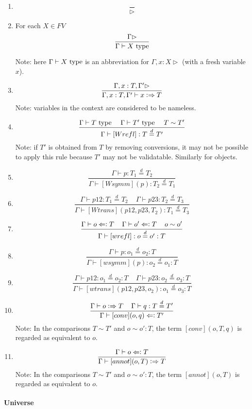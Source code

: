 \documentclass[11pt]{article}
\newcommand{\eqd}{\stackrel{d}{=}}
\newcommand{\spc}{{\,\,\,\,\,\,\,}}
\newcommand{\synth}{\vcentcolon\Rightarrow}
\newcommand{\force}{\Leftarrow\vcentcolon}
\newcommand{\Type}{\mathop{{\, \rm type}}}
\begin{document}
\begin{enumerate}
\item 
$$\frac{}{\rhd}$$
\item For each $X\in FV$
$$\frac{\Gamma\rhd}{\Gamma\vdash X \Type}$$

Note: here $\Gamma\vdash X \Type$ is an abbreviation for $\Gamma, x:X\rhd$
(with a fresh variable $x$).

\item 
$$\frac{\Gamma, x:T, \Gamma'\rhd}{\Gamma, x:T, \Gamma'\vdash x \synth T}$$
Note: variables in the context are considered to be nameless.

\item 
$$\frac{\Gamma \vdash T \Type\spc \Gamma \vdash T'\Type \spc T\sim T'}{\Gamma\vdash [Wrefl]: T\eqd T'}$$
Note: if $T'$ is obtained from $T$ by removing conversions, it may not be possible to apply
this rule because $T'$ may not be validatable.  Similarly for objects.
\item 
$$\frac{\Gamma\vdash p:T_1\eqd T_2}{\Gamma\vdash [Wsymm](p):T_2\eqd T_1}$$
\item 
$$\frac{\Gamma\vdash p12:T_1\eqd T_2\spc\Gamma\vdash p23:T_2\eqd T_3}{\Gamma\vdash [Wtrans](p12,p23,T_2): T_1\eqd T_3}$$
\item 
$$\frac{\Gamma\vdash o \force T\spc\Gamma\vdash o' \force T \spc o \sim o'}{\Gamma\vdash [wrefl]:o\eqd o':T}$$
\item 
$$\frac{\Gamma\vdash p:o_1\eqd o_2:T}{\Gamma\vdash [wsymm](p):o_2\eqd o_1:T}$$
\item 
$$\frac{\Gamma\vdash p12:o_1\eqd o_2:T\spc\Gamma\vdash p23:o_2\eqd o_3:T}{\Gamma\vdash [wtrans](p12,p23,o_2):o_1\eqd o_3:T}$$
\item 
$$\frac{\Gamma\vdash o \synth T\spc \Gamma\vdash q : T\eqd T'}{\Gamma\vdash [conv](o,q) \force T'}$$
Note: In the comparisons $T\sim T'$ and $o\sim o':T$, the term $[conv](o,T,q)$ is regarded as equivalent to $o$.
\item 
$$\frac{\Gamma\vdash o \force T}{\Gamma\vdash [annot](o,T) \synth T}$$
Note: In the comparisons $T\sim T'$ and $o\sim o':T$, the term $[annot](o,T)$ is regarded as equivalent to $o$.

\end{enumerate}



\paragraph{Universe}
\end{document}
